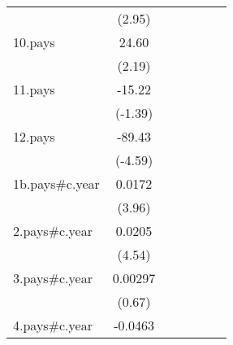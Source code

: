 {\begin{tabular}{l*{6}{c}}
                    &      (2.95)         &                     &                     &                     &                     &                     \\
[1em]
10.pays             &       24.60\sym{*}  &                     &                     &                     &                     &                     \\
                    &      (2.19)         &                     &                     &                     &                     &                     \\
[1em]
11.pays             &      -15.22         &                     &                     &                     &                     &                     \\
                    &     (-1.39)         &                     &                     &                     &                     &                     \\
[1em]
12.pays             &      -89.43\sym{***}&                     &                     &                     &                     &                     \\
                    &     (-4.59)         &                     &                     &                     &                     &                     \\
[1em]
1b.pays#c.year      &      0.0172\sym{***}&                     &                     &                     &                     &                     \\
                    &      (3.96)         &                     &                     &                     &                     &                     \\
[1em]
2.pays#c.year       &      0.0205\sym{***}&                     &                     &                     &                     &                     \\
                    &      (4.54)         &                     &                     &                     &                     &                     \\
[1em]
3.pays#c.year       &     0.00297         &                     &                     &                     &                     &                     \\
                    &      (0.67)         &                     &                     &                     &                     &                     \\
[1em]
4.pays#c.year       &     -0.0463\sym{***}&                     &                     &                     &                     &                     \\

\end{tabular}}
